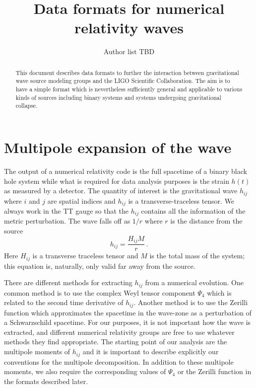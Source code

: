 \documentclass{article}
\title{Data formats for numerical relativity waves}
\date{\RCSDate}
\author{Author list TBD}
\numberwithin{equation}{section}
\begin{document}
\maketitle

\begin{abstract}
  This document describes data formats to further the interaction
  between gravitational wave source modeling groups and the LIGO
  Scientific Collaboration. The aim is to have a simple format which
  is nevertheless sufficiently general and applicable to various kinds
  of sources including binary systems and systems undergoing
  gravitational collapse.  
\end{abstract}

\section{Multipole expansion of the wave}
\label{sec:multipoles}

The output of a numerical relativity code is the full spacetime of a
binary black hole system while what is required for data analysis
purposes is the strain $h(t)$ as measured by a detector.  The quantity
of interest is the gravitational wave $h_{ij}$ where $i$ and $j$ are
spatial indices and $h_{ij}$ is a transverse-traceless tensor.  We
always work in the TT gauge so that the $h_{ij}$ contains all the
information of the metric perturbation.  The wave falls off as $1/r$
where $r$ is the distance from the source
\begin{equation}
  \label{eq:1}
  h_{ij} = \frac{H_{ij}M}{r} \,.
\end{equation}
Here $H_{ij}$ is a transverse traceless tensor and $M$ is the total
mass of the system; this equation is, naturally, only valid far away
from the source.  

There are different methods for extracting $h_{ij}$ from a numerical
evolution.  One common method is to use the complex Weyl tensor
component $\Psi_4$ which is related to the second time derivative of
$h_{ij}$. Another method is to use the Zerilli function which
approximates the spacetime in the wave-zone as a perturbation of a
Schwarzschild spacetime.  For our purposes, it is not important how
the wave is extracted, and different numerical relativity groups are
free to use whatever methods they find appropriate.  The starting
point of our analysis are the multipole moments of $h_{ij}$ and it is
important to describe explicitly our conventions for the multipole
decomposition.  In addition to these multipole moments, we also
require the corresponding values of $\Psi_4$ or the Zerilli function
in the formats described later.
\end{document}
